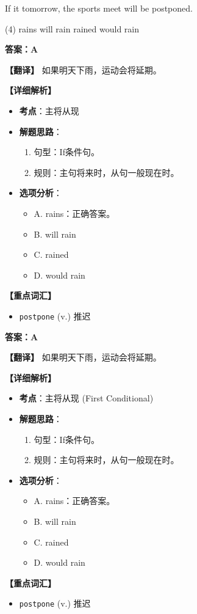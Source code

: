 \documentclass[11pt, a4paper]{article}
\newcommand{\analysis}[4]{
    \begin{solutionbox}
        \textbf{答案：#1}
        
        \textbf{【翻译】} #2
        
        \textbf{【详细解析】}
        #3
        
        \textbf{【重点词汇】}
        #4
    \end{solutionbox}
}
\newcommand{\blank}{\underline{\hspace{1.5cm}}}
\begin{document}
\begin{questions}
    \item If it \blank tomorrow, the sports meet will be postponed.
    \begin{tasks}(4)
        \task rains \task will rain \task rained \task would rain
    \end{tasks}
    \analysis{A}{如果明天下雨，运动会将延期。}{
        \begin{itemize}
            \item \textbf{考点}：主将从现
            \item \textbf{解题思路}：
                \begin{enumerate}
                    \item 句型：If条件句。
                    \item 规则：主句将来时，从句一般现在时。
                \end{enumerate}
            \item \textbf{选项分析}：
                \begin{itemize}
                    \item A. rains：正确答案。
                    \item B. will rain
                    \item C. rained
                    \item D. would rain
                \end{itemize}
        \end{itemize}
    }{
        \begin{itemize}
            \item \texttt{postpone} (v.) 推迟
        \end{itemize}
    }
    \analysis{A}{如果明天下雨，运动会将延期。}{
        \begin{itemize}
            \item \textbf{考点}：主将从现 (First Conditional)
            \item \textbf{解题思路}：
                \begin{enumerate}
                    \item 句型：If条件句。
                    \item 规则：主句将来时，从句一般现在时。
                \end{enumerate}
            \item \textbf{选项分析}：
                \begin{itemize}
                    \item A. rains：正确答案。
                    \item B. will rain
                    \item C. rained
                    \item D. would rain
                \end{itemize}
        \end{itemize}
    }{
        \begin{itemize}
            \item \texttt{postpone} (v.) 推迟
        \end{itemize}
    }


\end{questions}
\end{document}
